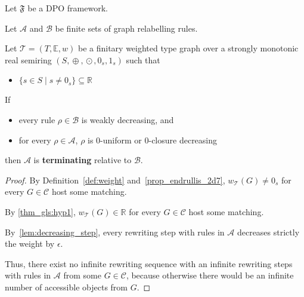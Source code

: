 \begin{theorem} 
  \label{thm:termination_gls}
  Let $\mathfrak{F}$ be a DPO framework.
  
  Let $\mathcal{A}$ and $\mathcal{B}$ be finite sets of graph relabelling rules.
  
  Let $\mathcal{T} \mathop{=} (T,\mathbb{E}, w)$ be a finitary weighted type graph over a strongly monotonic real semiring \( (S, \mathop{\oplus}, \mathop{\odot}, 0_s, 1_s)\) such that 
  \begin{itemize}
       \item\label{thm_gls:hyp1} $\{s \mathop{\in} S\mid s \mathop{\neq} 0_s\} \mathop{\subseteq} \mathbb{R}$
  \end{itemize}

  If  
  \begin{itemize}
  \item every rule $\rho \mathop{\in} \mathcal{B}$ is weakly decreasing, and
  \item for every $\rho \mathop{\in} \mathcal{A}$, $\rho$ is $0$-uniform or $0$-closure decreasing 
  \end{itemize}
  then $\mathcal{A }$ is \textbf{terminating} relative to $\mathcal{B }$.
\end{theorem}

\begin{proof}
  By Definition~\ref{def:weight} and~\autoref{prop_endrullis_2d7}, $w_\mathcal{T}(G) \mathop{\neq} 0_s$ for every $G \mathop{\in} \mathcal{C}$ host some matching.

  By \ref{thm_gls:hyp1}, $w_\mathcal{T}(G) \mathop{\in} \mathbb{R}$ for every $G \mathop{\in} \mathcal{C}$ host some matching.

  By~\autoref{lem:decreasing_step}, every rewriting step with rules in $\mathcal{A}$ decreases strictly the weight by $\epsilon$.

  Thus, there exist no infinite rewriting sequence with an infinite rewriting steps with rules in $\mathcal{A}$ from some $G \mathop{\in} \mathcal{C}$, because otherwise there would be an infinite number of accessible objects from $G$.
\end{proof}
